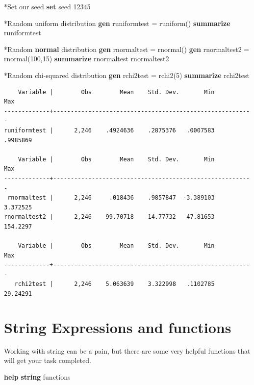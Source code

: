 \documentclass[
]{book}
\newenvironment{Shaded}{\begin{snugshade}}{\end{snugshade}}
\newcommand{\DecValTok}[1]{\textcolor[rgb]{0.00,0.00,0.81}{#1}}
\newcommand{\FunctionTok}[1]{\textcolor[rgb]{0.13,0.29,0.53}{\textbf{#1}}}
\newcommand{\KeywordTok}[1]{\textcolor[rgb]{0.13,0.29,0.53}{\textbf{#1}}}
\newcommand{\NormalTok}[1]{#1}
\begin{document}
\begin{Shaded}
\begin{Highlighting}[]
\NormalTok{*Set our }\DecValTok{seed}
\KeywordTok{set} \DecValTok{seed}\NormalTok{ 12345}

\NormalTok{*Random uniform distribution }
\KeywordTok{gen}\NormalTok{ runiformtest = runiform()}
\KeywordTok{summarize}\NormalTok{ runiformtest}

\NormalTok{*Random }\FunctionTok{normal}\NormalTok{ distribution}
\KeywordTok{gen}\NormalTok{ rnormaltest = rnormal()}
\KeywordTok{gen}\NormalTok{ rnormaltest2 = rnormal(100,15)}
\KeywordTok{summarize}\NormalTok{ rnormaltest rnormaltest2}

\NormalTok{*Random chi{-}squared distribution}
\KeywordTok{gen}\NormalTok{ rchi2test = rchi2(5)}
\KeywordTok{summarize}\NormalTok{ rchi2test}
\end{Highlighting}
\end{Shaded}

\begin{verbatim}
    Variable |        Obs        Mean    Std. Dev.       Min        Max
-------------+---------------------------------------------------------
runiformtest |      2,246    .4924636    .2875376   .0007583   .9985869

    Variable |        Obs        Mean    Std. Dev.       Min        Max
-------------+---------------------------------------------------------
 rnormaltest |      2,246     .018436    .9857847  -3.389103   3.372525
rnormaltest2 |      2,246    99.70718    14.77732   47.81653   154.2297

    Variable |        Obs        Mean    Std. Dev.       Min        Max
-------------+---------------------------------------------------------
   rchi2test |      2,246    5.063639    3.322998   .1102785   29.24291
\end{verbatim}

\section{String Expressions and functions}\label{string-expressions-and-functions}

Working with string can be a pain, but there are some very helpful functions that will get your task completed.

\begin{Shaded}
\begin{Highlighting}[]
\KeywordTok{help} \FunctionTok{string}\NormalTok{ functions}
\end{Highlighting}
\end{Shaded}
\end{document}
